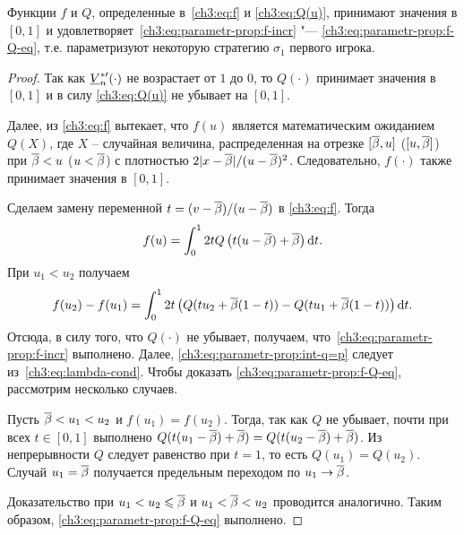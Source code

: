 {\begin{lemma}
  \label{ch3:lem:f-Q-is-strategy}
  Функции $f$ и $Q$\textnormal{,} определенные в~\eqref{ch3:eq:f} и \eqref{ch3:eq:Q(u)}\textnormal{,} принимают значения в $[0, 1]$ и удовлетворяет~\eqref{ch3:eq:parametr-prop:f-incr} "--- \eqref{ch3:eq:parametr-prop:f-Q-eq}\textnormal{,} т.е. параметризуют некоторую стратегию $\sigma_1$ первого игрока.
\end{lemma}
\begin{proof}
  Так как $\LV[ *\prime ]{n}(\cdot)$ не возрастает от $1$ до $0$, то $Q(\cdot)$ принимает значения в $[0, 1]$ и в силу \eqref{ch3:eq:Q(u)} не убывает на $[0, 1]$.

  Далее, из \eqref{ch3:eq:f} вытекает, что $f(u)$ является математическим ожиданием $Q(X)$, где $X$ -- случайная величина, распределенная на отрезке $[{{\overline{\beta}}}, u]$ ($[u, {{\overline{\beta}}}]$) при ${{\overline{\beta}}} < u$ ($u < {{\overline{\beta}}}$) с плотностью $2|x-{{\overline{\beta}}}|/(u-{{\overline{\beta}}})^2$.
  Следовательно, $f(\cdot)$ также принимает значения в $[0, 1]$.

  Сделаем замену переменной $t = (v - {{\overline{\beta}}})/(u - {{\overline{\beta}}})$ в \eqref{ch3:eq:f}. Тогда
  \begin{equation*}
    f(u) = \int_0^1 2 t Q \left( t(u - {{\overline{\beta}}}) + {{\overline{\beta}}} \right) \mathop{}\!\mathrm{d} t.
  \end{equation*}
  При $u_1 < u_2$ получаем
  \begin{equation*}
    f(u_2) - f(u_1) =
    \int_0^1 2t \left( 
      Q(t u_2 + {{\overline{\beta}}}(1-t)) - Q(t u_1 + {{\overline{\beta}}} (1-t))
    \right) \mathop{}\!\mathrm{d} t.
  \end{equation*}
  Отсюда, в силу того, что $Q(\cdot)$ не убывает, получаем, что~\eqref{ch3:eq:parametr-prop:f-incr} выполнено.
  Далее, \eqref{ch3:eq:parametr-prop:int-q=p} следует из~\ref{ch3:eq:lambda-cond}.
  Чтобы доказать \eqref{ch3:eq:parametr-prop:f-Q-eq}, рассмотрим несколько случаев.

  Пусть ${{\overline{\beta}}} < u_1 < u_2$ и $f(u_1) = f(u_2)$.
  Тогда, так как $Q$ не убывает, почти при всех $t \in [0, 1]$ выполнено $ Q(t(u_1 - {{\overline{\beta}}}) + {{\overline{\beta}}}) = Q(t(u_2 - {{\overline{\beta}}}) + {{\overline{\beta}}})$.
  Из непрерывности $Q$ следует равенство при $t = 1$, то есть $Q(u_1) = Q(u_2)$.
  Случай $u_1 = {{\overline{\beta}}}$ получается предельным переходом по $u_1 \rightarrow {{\overline{\beta}}}$.

  Доказательство при $u_1 < u_2 \leqslant {{\overline{\beta}}}$ и $u_1 < {{\overline{\beta}}} < u_2$ проводится аналогично.
  Таким образом, \eqref{ch3:eq:parametr-prop:f-Q-eq} выполнено.
\end{proof}

}
